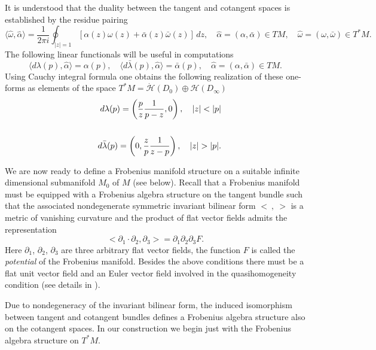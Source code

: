 \documentclass[numbook, envcountsame, envcountreset]{svjour3}
\begin{document}
It is understood that the duality between the tangent and cotangent spaces is established by the residue pairing 
\begin{equation}\label{pair}
\langle \hat\omega, \hat\alpha\rangle= \frac1{2\pi i} \oint_{|z|=1} \left[\alpha(z) \omega(z) + \bar\alpha(z)\bar\omega(z)\right]\, dz, \quad \hat\alpha=(\alpha,\bar\alpha)\in TM, \quad \hat\omega=(\omega, \bar\omega)\in T^*M.
\end{equation}
The following linear functionals will be useful in computations
\begin{equation}\label{dlam}
\langle d\lambda(p), \hat\alpha\rangle = \alpha(p), \quad \langle d\bar\lambda(p), \hat\alpha\rangle=\bar\alpha(p), \quad \hat\alpha=(\alpha,\bar\alpha)\in TM.
\end{equation}
Using Cauchy integral formula one obtains the following realization of these one-forms as elements of the space $T^*M= \dot{\mathcal H}(D_0) \oplus {\mathcal H}(D_\infty)$
\begin{eqnarray}\label{dlam1}
&&
d\lambda(p) =\left(\frac{p}{z} \frac1{p-z}, 0\right), \quad |z|< |p|
{\nonumber}\\
&&
\\
&&
d\bar\lambda(p) =\left(0, \frac{z}{p} \frac1{z-p}\right), \quad |z|>|p|.
{\nonumber}
\end{eqnarray}

We are now ready to define a Frobenius manifold structure on a suitable infinite dimensional submanifold $M_0$ of $M$ (see below). Recall that a Frobenius manifold must be equipped with a Frobenius algebra structure on the tangent bundle such that the associated nondegenerate symmetric invariant bilinear form $< ~,~>$ is a metric of vanishing curvature and the product of flat vector fields admits the representation
\begin{equation}\label{fro1}
<{\partial}_1\cdot {\partial}_2, {\partial}_3> ={\partial}_1 {\partial}_2{\partial}_3 F.
\end{equation}
Here ${\partial}_1$, ${\partial}_2$, ${\partial}_3$ are three arbitrary flat vector fields, the function $F$ is called the {\it potential} of the Frobenius manifold.
Besides the above conditions there must be a flat unit vector field and an Euler vector field involved in the quasihomogeneity condition (see details in \cite{icm}). 

Due to nondegeneracy of the invariant bilinear form, the induced isomorphism between tangent and cotangent bundles defines a Frobenius algebra structure also on the cotangent spaces. In our construction we begin just with the Frobenius algebra structure on $T^*M$.
\end{document}
